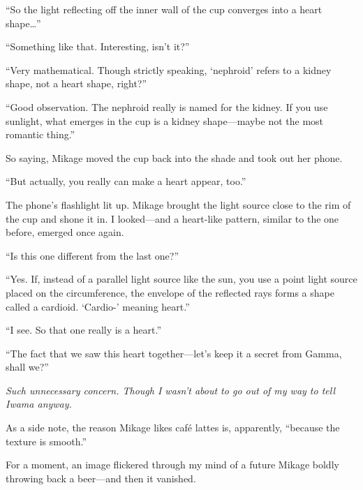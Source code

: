 \documentclass[
    a4paper,
    12pt,
    twoside,
    openany,
    UTF8,
    fontset=windows
]{ctexbook}
\begin{document}
``So the light reflecting off the inner wall of the cup converges into a heart shape\dots''

``Something like that. Interesting, isn't it?''

``Very mathematical. Though strictly speaking, `nephroid' refers to a kidney shape, not a heart shape, right?''

``Good observation. The nephroid really is named for the kidney. If you use sunlight, what emerges in the cup is a kidney shape---maybe not the most romantic thing.''

So saying, Mikage moved the cup back into the shade and took out her phone.

``But actually, you really can make a heart appear, too.''

The phone's flashlight lit up. Mikage brought the light source close to the rim of the cup and shone it in. I looked---and a heart-like pattern, similar to the one before, emerged once again.

``Is this one different from the last one?''

``Yes. If, instead of a parallel light source like the sun, you use a point light source placed on the circumference, the envelope of the reflected rays forms a shape called a cardioid. `Cardio-' meaning heart.''

``I see. So that one really is a heart.''

``The fact that we saw this heart together---let's keep it a secret from Gamma, shall we?''

\textit{Such unnecessary concern. Though I wasn't about to go out of my way to tell Iwama anyway.}

As a side note, the reason Mikage likes café lattes is, apparently, ``because the texture is smooth.''

For a moment, an image flickered through my mind of a future Mikage boldly throwing back a beer---and then it vanished.
\end{document}
